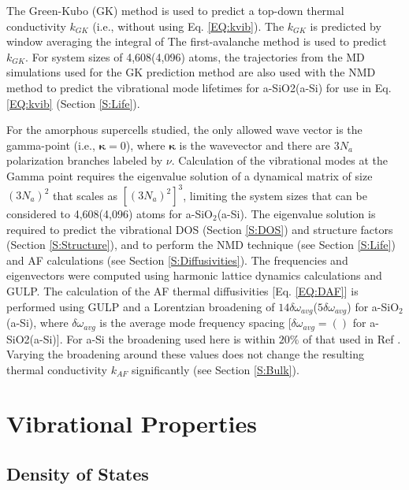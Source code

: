 \documentclass[aps,prb,onecolumn,preprint,superscriptaddress,footinbib,amsmath,amssymb,floatfix]{revtex4}
\begin{document}
The Green-Kubo (GK) method is used to predict a top-down thermal 
conductivity $k_{GK}$ (i.e., without using Eq. \eqref{EQ:kvib}). 
The $k_{GK}$ is predicted by window averaging the integral of 
The first-avalanche method is used to predict $k_{GK}$.
\cite{chen_how_2010} 
For system sizes of 4,608(4,096) atoms, the trajectories from 
the MD simulations used for the GK prediction method are 
also used with the NMD method to predict 
the vibrational mode lifetimes for a-SiO2(a-Si) for use in 
Eq. \eqref{EQ:kvib} (Section \ref{S:Life}). 

For the amorphous supercells studied,
the only allowed wave vector is the gamma-point (i.e., $\pmb{\kappa}=0$),  
where $\pmb{\kappa}$ is the wavevector and there are $3N_a$ polarization 
branches labeled by $\nu$. 
Calculation of the 
vibrational modes at the Gamma point  
requires the eigenvalue solution 
of a dynamical matrix of size 
$(3N_a)^2$ that scales as $[(3N_a)^2]^3$, limiting the system 
sizes that can be considered to 4,608(4,096) atoms for 
a-SiO$_2$(a-Si). 
The eigenvalue solution is required to predict the vibrational 
DOS (Section \ref{S:DOS}) and structure factors 
(Section \ref{S:Structure}), and to perform the NMD technique  
(see Section \ref{S:Life})  
and AF calculations (see Section \ref{S:Diffusivities}). 
The frequencies and eigenvectors were computed using harmonic
lattice dynamics calculations and GULP.\cite{gale_general_2003} 
The calculation of the AF thermal diffusivities 
[Eq. \eqref{EQ:DAF}] 
is performed using GULP and a Lorentzian 
broadening of $14\delta\omega_{avg}$($5\delta\omega_{avg}$) for 
a-SiO$_2$(a-Si), where $\delta\omega_{avg}$ is the average mode 
frequency spacing [$\delta\omega_{avg} = ()$ for a-SiO2(a-Si)].
\cite{feldman_thermal_1993,feldman_numerical_1999} 
For a-Si the broadening used here is within 
$20\%$ of that used 
in Ref . 
Varying the broadening around these values does not 
change the resulting thermal conductivity $k_{AF}$ significantly 
(see Section \ref{S:Bulk}). 

\section{\label{S:Vibrational}Vibrational Properties}

\subsection{\label{S:DOS}Density of States}
\end{document}
